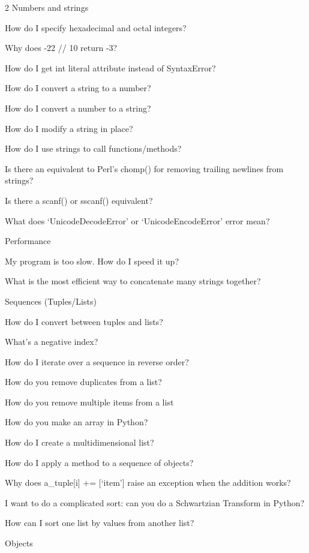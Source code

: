 \documentclass [8pt] {extarticle}
\begin{document}
\begin {multicols} {2}
        Numbers and strings

            How do I specify hexadecimal and octal integers?

            Why does -22 // 10 return -3?

            How do I get int literal attribute instead of SyntaxError?

            How do I convert a string to a number?

            How do I convert a number to a string?

            How do I modify a string in place?

            How do I use strings to call functions/methods?

            Is there an equivalent to Perl’s chomp() for removing trailing newlines from strings?

            Is there a scanf() or sscanf() equivalent?

            What does ‘UnicodeDecodeError’ or ‘UnicodeEncodeError’ error mean?

        Performance

            My program is too slow. How do I speed it up?

            What is the most efficient way to concatenate many strings together?

        Sequences (Tuples/Lists)

            How do I convert between tuples and lists?

            What’s a negative index?

            How do I iterate over a sequence in reverse order?

            How do you remove duplicates from a list?

            How do you remove multiple items from a list

            How do you make an array in Python?

            How do I create a multidimensional list?

            How do I apply a method to a sequence of objects?

            Why does a\_tuple[i] += [‘item’] raise an exception when the addition works?

            I want to do a complicated sort: can you do a Schwartzian Transform in Python?

            How can I sort one list by values from another list?

        Objects


\end{multicols}
\end{document}
